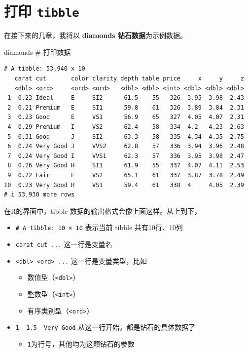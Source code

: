 \documentclass[
  letterpaper,
]{ctexbook}
\newenvironment{Shaded}{\begin{snugshade}}{\end{snugshade}}
\newcommand{\CommentTok}[1]{\textcolor[rgb]{0.37,0.37,0.37}{#1}}
\newcommand{\NormalTok}[1]{\textcolor[rgb]{0.00,0.23,0.31}{#1}}
\providecommand{\tightlist}{%
  \setlength{\itemsep}{0pt}\setlength{\parskip}{0pt}}\usepackage{longtable,booktabs,array}
\begin{document}
\hypertarget{ux6253ux5370-tibble}{%
\section{\texorpdfstring{打印
\texttt{tibble}}{打印 tibble}}\label{ux6253ux5370-tibble}}

在接下来的几章，我将以 \textbf{diamonds 钻石数据}为示例数据。

\begin{Shaded}
\begin{Highlighting}[]
\NormalTok{diamonds }\CommentTok{\# 打印数据}
\end{Highlighting}
\end{Shaded}

\begin{verbatim}
# A tibble: 53,940 x 10
   carat cut       color clarity depth table price     x     y     z
   <dbl> <ord>     <ord> <ord>   <dbl> <dbl> <int> <dbl> <dbl> <dbl>
 1  0.23 Ideal     E     SI2      61.5    55   326  3.95  3.98  2.43
 2  0.21 Premium   E     SI1      59.8    61   326  3.89  3.84  2.31
 3  0.23 Good      E     VS1      56.9    65   327  4.05  4.07  2.31
 4  0.29 Premium   I     VS2      62.4    58   334  4.2   4.23  2.63
 5  0.31 Good      J     SI2      63.3    58   335  4.34  4.35  2.75
 6  0.24 Very Good J     VVS2     62.8    57   336  3.94  3.96  2.48
 7  0.24 Very Good I     VVS1     62.3    57   336  3.95  3.98  2.47
 8  0.26 Very Good H     SI1      61.9    55   337  4.07  4.11  2.53
 9  0.22 Fair      E     VS2      65.1    61   337  3.87  3.78  2.49
10  0.23 Very Good H     VS1      59.4    61   338  4     4.05  2.39
# i 53,930 more rows
\end{verbatim}

在R的界面中，tibble 数据的输出格式会像上面这样。从上到下，

\begin{itemize}
\tightlist
\item
  \texttt{\#\ A\ tibble:\ 10\ ×\ 10} 表示当前 tibble 共有10行、10列
\item
  \texttt{carat\ cut\ ...} 这一行是变量名
\item
  \texttt{\textless{}dbl\textgreater{}\ \textless{}ord\textgreater{}\ ...}
  这一行是变量类型，比如

  \begin{itemize}
  \tightlist
  \item
    数值型（\texttt{\textless{}dbl\textgreater{}}）
  \item
    整数型（\texttt{\textless{}int\textgreater{}}）
  \item
    有序类别型（\texttt{\textless{}ord\textgreater{}}）
  \end{itemize}
\item
  \texttt{1\ \ 1.5\ \ Very\ Good} 从这一行开始，都是钻石的具体数据了

  \begin{itemize}
  \tightlist
  \item
    \texttt{1}为行号，其他均为这颗钻石的参数
  \end{itemize}
\end{itemize}
\end{document}
